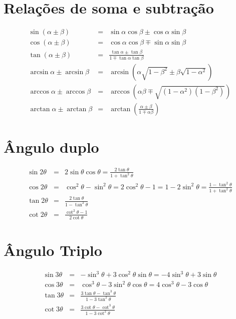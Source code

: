 \section{Relações de soma e subtração}

\begin{eqnarray}
\sin(\alpha \pm \beta) & =& \sin \alpha \cos \beta \pm \cos \alpha \sin \beta \\
\cos(\alpha \pm \beta) & =& \cos \alpha \cos \beta \mp \sin \alpha \sin \beta \\
\tan(\alpha \pm \beta) &= &\frac{\tan \alpha \pm \tan \beta}{1 \mp \tan \alpha \tan \beta}\\
\arcsin\alpha \pm \arcsin\beta &=& \arcsin\left(\alpha\sqrt{1-\beta^2} \pm \beta\sqrt{1-\alpha^2}\right)\\
\arccos\alpha \pm \arccos\beta &=& \arccos\left(\alpha\beta \mp \sqrt{(1-\alpha^2)(1-\beta^2)}\right)\\
\arctan\alpha \pm \arctan\beta &=&\arctan\left(\frac{\alpha \pm \beta}{1 \mp \alpha\beta}\right)
\end{eqnarray}



\section{Ângulo duplo}


\begin{eqnarray}
\sin 2\theta &=& 2 \sin \theta \cos \theta  = \frac{2 \tan \theta} {1 + \tan^2 \theta} \\
\cos 2\theta &=& \cos^2 \theta - \sin^2 \theta = 2 \cos^2 \theta - 1 = 1 - 2 \sin^2 \theta = \frac{1 - \tan^2 \theta} {1 + \tan^2 \theta}\\
\tan 2\theta &=& \frac{2 \tan \theta} {1 - \tan^2 \theta}\\
\cot 2\theta &=& \frac{\cot^2 \theta - 1}{2 \cot \theta}
\end{eqnarray}


\section{Ângulo Triplo}


\begin{eqnarray}
\sin 3\theta &=& - \sin^3\theta + 3 \cos^2\theta \sin\theta 
= - 4\sin^3\theta + 3\sin\theta  \\
\cos 3\theta  &=& \cos^3\theta - 3 \sin^2 \theta\cos \theta =
4 \cos^3\theta - 3 \cos\theta \\
\tan 3\theta &=& \frac{3 \tan\theta - \tan^3\theta}{1 - 3 \tan^2\theta}\\
\cot 3\theta &=& \frac{3 \cot\theta - \cot^3\theta}{1 - 3 \cot^2\theta}
\end{eqnarray}


